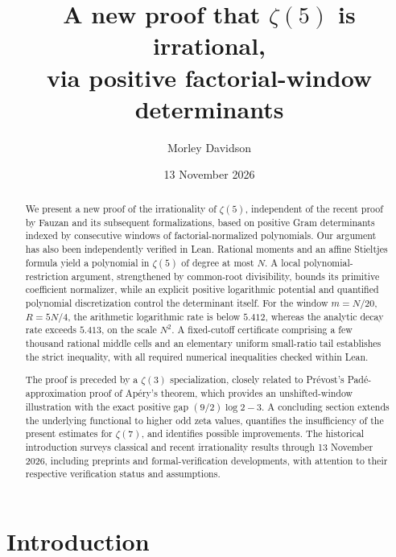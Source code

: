 \documentclass[11pt,letterpaper]{article}
\title{\textbf{A new proof that $\zeta(5)$ is irrational,\\ via positive factorial-window determinants}}
\author{Morley Davidson}
\date{13 November 2026}
\theoremstyle{definition}
\begin{document}
\maketitle
\begin{center}

\end{center}
\begin{abstract}
We present a new proof of the irrationality of \(\zeta(5)\), independent of the recent proof by Fauzan and its subsequent formalizations, based on positive Gram determinants indexed by consecutive windows of factorial-normalized polynomials. Our argument has also been independently verified in Lean. Rational moments and an affine Stieltjes formula yield a polynomial in \(\zeta(5)\) of degree at most \(N\). A local polynomial-restriction argument, strengthened by common-root divisibility, bounds its primitive coefficient normalizer, while an explicit positive logarithmic potential and quantified polynomial discretization control the determinant itself. For the window \(m=N/20\), \(R=5N/4\), the arithmetic logarithmic rate is below \(5.412\), whereas the analytic decay rate exceeds \(5.413\), on the scale \(N^2\). A fixed-cutoff certificate comprising a few thousand rational middle cells and an elementary uniform small-ratio tail establishes the strict inequality, with all required numerical inequalities checked within Lean.

The proof is preceded by a \(\zeta(3)\) specialization, closely related to Prévost's Padé-approximation proof of Apéry's theorem, which provides an unshifted-window illustration with the exact positive gap \((9/2)\log 2-3\). A concluding section extends the underlying functional to higher odd zeta values, quantifies the insufficiency of the present estimates for \(\zeta(7)\), and identifies possible improvements. The historical introduction surveys classical and recent irrationality results through 13 November 2026, including preprints and formal-verification developments, with attention to their respective verification status and assumptions.

\end{abstract}
\clearpage
\begingroup
\footnotesize
\setlength{\parskip}{0pt}
\setlength{\baselineskip}{10.5pt}
\tableofcontents
\endgroup
\clearpage

\section{Introduction}\label{sec:history}
\end{document}
